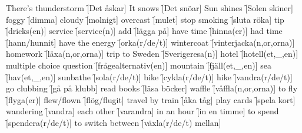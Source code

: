 \begin{questions}
\begin{multicols}{2}
        \question There's thunderstorm \f[Det åskar]
        \question It snows \f[Det snöar]
        \question Sun shines \f[Solen skiner]
        \question foggy \f[dimma]
        \question cloudy \f[molnigt]
        \question overcast \f[mulet]
        \question stop smoking \f[sluta röka]
        \question tip \f[dricks(en)]
        \question service \f[service(n)]
        \question add \f[lägga på]
        \question have time \f[hinna(er)]
        \question had time \f[hann/hunnit]
        \question have the energy \f[orka(r/de/t)]
        \question wintercoat \f[vinterjacka(n,or,orna)]
        \question homework \f[läxa(n,or,orna)]
        \question trip to Sweden \f[Sverigeresa(n)]
        \question hotel \f[hotell(et,\_,en)]
        \question multiple choice question \f[frågealternativ(en)]
        \question mountain \f[fjäll(et,\_,en)]
        \question sea \f[hav(et,\_,en)]
        \question sunbathe \f[sola(r/de/t)]
        \question bike \f[cykla(r/de/t)]
        \question hike \f[vandra(r/de/t)]
        \question go clubbing \f[gå på klubb]
        \question read books \f[läsa böcker]
        \question waffle \f[våffla(n,or,orna)]
        \question to fly \f[flyga(er)]
        \question flew/flown \f[flög/flugit]
        \question travel by train \f[åka tåg]
        \question play cards \f[spela kort]
        \question wandering \f[vandra]
        \question each other \f[varandra]
        \question in an hour \f[in en timme]
        \question to spend \f[spendera(r/de/t)]
        \question to switch between \f[växla(r/de/t) mellan]
    \end{multicols}
\end{questions}
